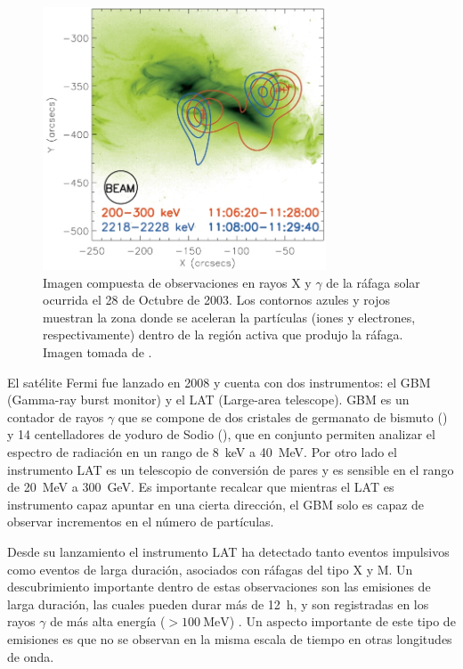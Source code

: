 \begin{figure}
        \centering
        \includegraphics[width=0.75\textwidth]{flare-footprints}
        \caption{Imagen compuesta de observaciones en rayos X y $\gamma$ de la ráfaga solar ocurrida el \num{28} de Octubre de \num{2003}. Los contornos azules y rojos muestran la zona donde se aceleran la partículas (iones y electrones, respectivamente) dentro de la región activa que produjo la ráfaga. Imagen tomada de \cite{hurford03}.}
        \label{fig:flare-foot}
\end{figure}

El satélite Fermi fue lanzado en \num{2008} y cuenta con dos instrumentos: el GBM (Gamma-ray burst monitor) y el LAT (Large-area telescope). GBM es un contador de rayos $\gamma$ que se compone de dos cristales de  germanato de bismuto () y \num{14} centelladores de yoduro de Sodio (), que en conjunto permiten analizar el espectro de radiación en un rango de \SI{8}{\kilo\electronvolt} a \SI{40}{\mega\electronvolt}. Por otro lado el instrumento LAT es un telescopio de conversión de pares y es sensible en el rango de \SI{20}{\mega\electronvolt} a \SI{300}{\giga\electronvolt}. Es importante recalcar que mientras el LAT es instrumento capaz apuntar en una cierta dirección, el GBM solo es capaz de observar incrementos en el número de partículas.

Desde su lanzamiento el instrumento LAT ha detectado tanto eventos impulsivos como eventos de larga duración, asociados con ráfagas del tipo X y M. Un descubrimiento importante dentro de estas observaciones son las emisiones de larga duración, las cuales pueden durar más de \SI{12}{\hour}, y son registradas en los rayos $\gamma$ de más alta energía ($>\SI{100}{\mega\electronvolt}$) \cite{ackermann14}. Un aspecto importante de este tipo de emisiones es que no se observan en la misma escala de tiempo en otras longitudes de onda.

